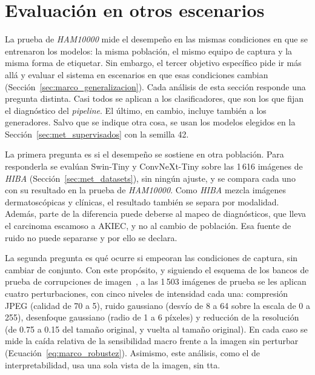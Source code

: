 
\section{Evaluación en otros escenarios}
\label{sec:met_complementarios}

La prueba de \emph{HAM10000} mide el desempeño en las mismas condiciones en que se entrenaron los modelos: la misma
población, el mismo equipo de captura y la misma forma de etiquetar. Sin embargo, el tercer objetivo específico pide ir
más allá y evaluar el sistema en escenarios en que esas condiciones cambian (Sección~\ref{sec:marco_generalizacion}).
Cada análisis de esta sección responde una pregunta distinta. Casi todos se aplican a los
clasificadores, que son los que fijan el diagnóstico del \emph{pipeline}. El último, en cambio, incluye también a los
generadores. Salvo que se indique otra cosa, se usan los modelos elegidos en la
Sección~\ref{sec:met_supervisados} con la semilla 42.

La primera pregunta es si el desempeño se sostiene en otra población. Para responderla se evalúan Swin-Tiny y
ConvNeXt-Tiny sobre las 1\,616 imágenes de \emph{HIBA} (Sección~\ref{sec:met_datasets}), sin ningún ajuste, y se
compara cada uno con su resultado en la prueba de \emph{HAM10000}. Como \emph{HIBA} mezcla imágenes dermatoscópicas y
clínicas, el resultado también se separa por modalidad. Además, parte de la diferencia puede deberse al mapeo de diagnósticos,
que lleva el carcinoma escamoso a AKIEC, y no al cambio de población. Esa fuente de ruido no puede separarse y por ello
se declara.

La segunda pregunta es qué ocurre si empeoran las condiciones de captura, sin cambiar de conjunto. Con este
propósito, y siguiendo el esquema de los bancos de prueba de corrupciones de imagen~\cite{hendrycks2019benchmarking},
a las 1\,503 imágenes de prueba se les aplican cuatro perturbaciones, con cinco niveles de intensidad cada una: compresión JPEG (calidad de 70 a 5), ruido gaussiano (desvío de 8 a 64 sobre la escala de 0 a 255), desenfoque gaussiano (radio de 1 a
6 píxeles) y reducción de la resolución (de 0.75 a 0.15 del tamaño original, y vuelta al tamaño original). En cada caso
se mide la caída relativa de la sensibilidad macro frente a la imagen sin perturbar
(Ecuación~\ref{eq:marco_robustez}).
Asimismo, este análisis, como el de interpretabilidad, usa una sola vista de la imagen, sin \gls{tta}.

